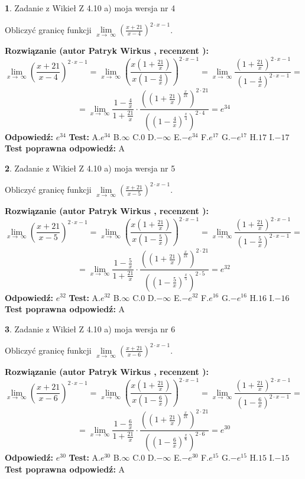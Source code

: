\documentclass[12pt, a4paper]{article}
\theoremstyle{definition} %
\newtheorem{zad}{}
\newcommand{\zadStart}[1]{\begin{zad}#1\newline}
\newcommand{\zadStop}{\end{zad}}
\newcommand{\rozwStart}[2]{\noindent \textbf{Rozwiązanie (autor #1 , recenzent #2): }\newline}
\newcommand{\rozwStop}{\newline}
\newcommand{\odpStart}{\noindent \textbf{Odpowiedź:}\newline}
\newcommand{\odpStop}{\newline}
\newcommand{\testStart}{\noindent \textbf{Test:}\newline}
\newcommand{\testStop}{\newline}
\newcommand{\kluczStart}{\noindent \textbf{Test poprawna odpowiedź:}\newline}
\newcommand{\kluczStop}{\newline}
\begin{document}
\zadStart{Zadanie z Wikieł Z 4.10 a) moja wersja nr 4}

Obliczyć granicę funkcji  $\lim\limits_{x\to\ \infty}(\frac{x+21}{x-4})^{2\cdot x-1}$.
\zadStop
\rozwStart{Patryk Wirkus}{}
$$\lim\limits_{x\to\ \infty}(\frac{x+21}{x-4})^{2\cdot x-1} = \lim\limits_{x\to\ \infty}(\frac{x(1+\frac{21}{x})}{x(1-\frac{4}{x})})^{2\cdot x-1}=\lim\limits_{x\to\ \infty}\frac{(1+\frac{21}{x})^{2\cdot x-1}}{(1-\frac{4}{x})^{2\cdot x-1}}=$$
$$=\lim\limits_{x\to\ \infty}\frac{1-\frac{4}{x}}{1+\frac{21}{x}}\cdot\frac{((1+\frac{21}{x})^{\frac{x}{21}})^{2\cdot21}}{((1-\frac{4}{x})^{\frac{x}{4}})^{2\cdot4}}=e^{34}$$
\rozwStop
\odpStart
$e^{34}$
\odpStop
\testStart
A.$e^{34}$ B.$\infty$ C.$0$ D.$-\infty$ E.$-e^{34}$
F.$e^{17}$ G.$-e^{17}$
H.$17$
I.$-17$
\testStop
\kluczStart
A
\kluczStop



\zadStart{Zadanie z Wikieł Z 4.10 a) moja wersja nr 5}

Obliczyć granicę funkcji  $\lim\limits_{x\to\ \infty}(\frac{x+21}{x-5})^{2\cdot x-1}$.
\zadStop
\rozwStart{Patryk Wirkus}{}
$$\lim\limits_{x\to\ \infty}(\frac{x+21}{x-5})^{2\cdot x-1} = \lim\limits_{x\to\ \infty}(\frac{x(1+\frac{21}{x})}{x(1-\frac{5}{x})})^{2\cdot x-1}=\lim\limits_{x\to\ \infty}\frac{(1+\frac{21}{x})^{2\cdot x-1}}{(1-\frac{5}{x})^{2\cdot x-1}}=$$
$$=\lim\limits_{x\to\ \infty}\frac{1-\frac{5}{x}}{1+\frac{21}{x}}\cdot\frac{((1+\frac{21}{x})^{\frac{x}{21}})^{2\cdot21}}{((1-\frac{5}{x})^{\frac{x}{5}})^{2\cdot5}}=e^{32}$$
\rozwStop
\odpStart
$e^{32}$
\odpStop
\testStart
A.$e^{32}$ B.$\infty$ C.$0$ D.$-\infty$ E.$-e^{32}$
F.$e^{16}$ G.$-e^{16}$
H.$16$
I.$-16$
\testStop
\kluczStart
A
\kluczStop



\zadStart{Zadanie z Wikieł Z 4.10 a) moja wersja nr 6}

Obliczyć granicę funkcji  $\lim\limits_{x\to\ \infty}(\frac{x+21}{x-6})^{2\cdot x-1}$.
\zadStop
\rozwStart{Patryk Wirkus}{}
$$\lim\limits_{x\to\ \infty}(\frac{x+21}{x-6})^{2\cdot x-1} = \lim\limits_{x\to\ \infty}(\frac{x(1+\frac{21}{x})}{x(1-\frac{6}{x})})^{2\cdot x-1}=\lim\limits_{x\to\ \infty}\frac{(1+\frac{21}{x})^{2\cdot x-1}}{(1-\frac{6}{x})^{2\cdot x-1}}=$$
$$=\lim\limits_{x\to\ \infty}\frac{1-\frac{6}{x}}{1+\frac{21}{x}}\cdot\frac{((1+\frac{21}{x})^{\frac{x}{21}})^{2\cdot21}}{((1-\frac{6}{x})^{\frac{x}{6}})^{2\cdot6}}=e^{30}$$
\rozwStop
\odpStart
$e^{30}$
\odpStop
\testStart
A.$e^{30}$ B.$\infty$ C.$0$ D.$-\infty$ E.$-e^{30}$
F.$e^{15}$ G.$-e^{15}$
H.$15$
I.$-15$
\testStop
\kluczStart
A
\kluczStop
\end{document}
